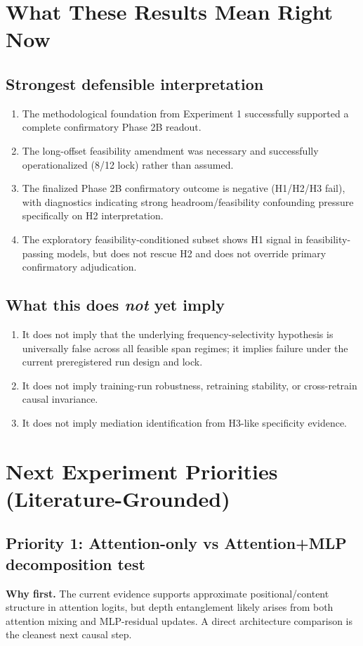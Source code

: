 \documentclass[11pt]{article}
\begin{document}
\section{What These Results Mean Right Now}
\subsection*{Strongest defensible interpretation}
\begin{enumerate}[leftmargin=*]
  \item The methodological foundation from Experiment 1 successfully supported a complete confirmatory Phase 2B readout.
  \item The long-offset feasibility amendment was necessary and successfully operationalized (8/12 lock) rather than assumed.
  \item The finalized Phase 2B confirmatory outcome is negative (H1/H2/H3 fail), with diagnostics indicating strong headroom/feasibility confounding pressure specifically on H2 interpretation.
  \item The exploratory feasibility-conditioned subset shows H1 signal in feasibility-passing models, but does not rescue H2 and does not override primary confirmatory adjudication.
\end{enumerate}

\subsection*{What this does \emph{not} yet imply}
\begin{enumerate}[leftmargin=*]
  \item It does not imply that the underlying frequency-selectivity hypothesis is universally false across all feasible span regimes; it implies failure under the current preregistered run design and lock.
  \item It does not imply training-run robustness, retraining stability, or cross-retrain causal invariance.
  \item It does not imply mediation identification from H3-like specificity evidence.
\end{enumerate}

\section{Next Experiment Priorities (Literature-Grounded)}
\subsection*{Priority 1: Attention-only vs Attention+MLP decomposition test}
\textbf{Why first.} The current evidence supports approximate positional/content structure in attention logits, but depth entanglement likely arises from both attention mixing and MLP-residual updates. A direct architecture comparison is the cleanest next causal step.
\end{document}

